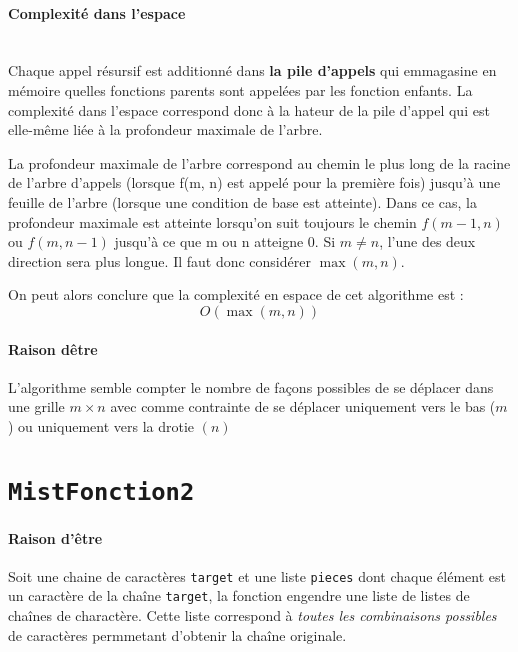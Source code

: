 \documentclass[10pt]{report}
\begin{document}
  \paragraph{Complexité dans l'espace}
  \mbox{}\\
  Chaque appel résursif est additionné dans 
  \textbf{la pile d'appels} qui emmagasine en mémoire 
  quelles fonctions parents sont appelées par les fonction enfants. 
  La complexité dans l'espace correspond donc à la hateur de la pile d'appel 
  qui est elle-même liée à la profondeur maximale de l'arbre. 


  
  La profondeur maximale de l'arbre correspond 
  au chemin le plus long de la racine de l'arbre d'appels (lorsque f(m, n) 
  est appelé pour la première fois) jusqu'à une feuille de l'arbre 
  (lorsque une condition de base est atteinte). 
  Dans ce cas, la profondeur maximale est atteinte lorsqu'on 
  suit toujours le chemin $f(m - 1, n)  $ou $f(m, n - 1)$ jusqu'à
  ce que m ou n atteigne 0. Si $m \neq n$, l'une des deux direction sera plus longue. 
  Il faut donc considérer $\max(m, n)$. 

  On peut alors conclure que la complexité
  en espace de cet algorithme est : 
  \[ O(\max(m, n)) \]


  \paragraph{Raison dêtre}
  L'algorithme semble compter le nombre de façons possibles de se déplacer 
  dans une grille $m \times n$ avec comme contrainte de se déplacer uniquement 
  vers le bas ($m$) ou uniquement vers la drotie $(n)$
  \section{\texttt{MistFonction2}} 
  \paragraph{Raison d'être}
  Soit une chaine de caractères \texttt{target} et une liste 
  \texttt{pieces} dont chaque élément est un caractère de  
  la chaîne \texttt{target}, la fonction engendre une 
  liste de listes de chaînes de charactère. Cette liste correspond 
  à \textit{toutes les combinaisons possibles} de caractères permmetant 
  d'obtenir la chaîne originale. 
\end{document}
